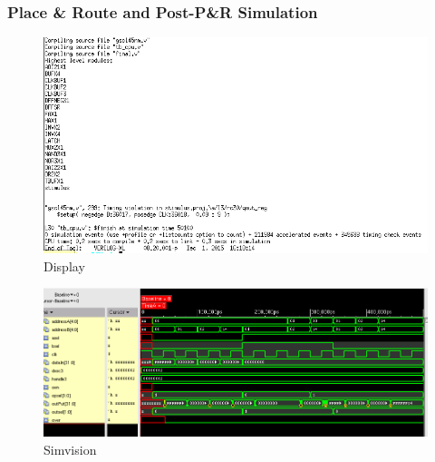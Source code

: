 \documentclass[12pt]{article}
\begin{document}
\subsubsection{Place \& Route and Post-P\&R Simulation}
\begin{figure}[H]
\centering
\includegraphics[width=.7\linewidth]{../CSeA/encounter-text}
\caption{Display}
\label{fig:encounter-text}
\end{figure}
\begin{figure}[H]
\centering
\includegraphics[width=\linewidth]{../CSeA/encounter-test}
\caption{Simvision}
\label{fig:encounter-test}
\end{figure}
\end{document}

